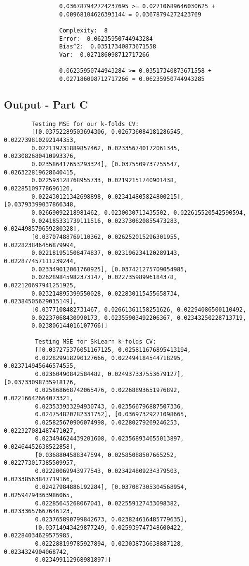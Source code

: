 \begin{verbatim}
                0.036787942724237695 >= 0.02710689646030625 + 
                0.00968104626393144 = 0.03678794272423769
                
                Complexity:  8
                Error:  0.06235950744943284
                Bias^2:  0.03517340873671558
                Var:  0.027186098712717266
                
                0.06235950744943284 >= 0.03517340873671558 + 
                0.027186098712717266 = 0.06235950744943285
\end{verbatim}

\subsection{Output - Part C}
\label{chap:Output - Part C}
\begin{verbatim}
        Testing MSE for our k-folds CV:  
        [[0.03752289503694306, 0.026736084181286545, 0.022739810292144353,
        0.022119731889857462, 0.023356740172061345, 0.023082680410993376,
        0.023586417653293324], [0.0375509737755547, 0.026322819628640415,
        0.022593128768955733, 0.02192151740901438, 0.02285109778696126,
        0.022430121342698898, 0.023414805824800215], [0.03793399037866348,
        0.02669092218981462, 0.0230030713435502, 0.022615520542590594,
        0.024185331739111516, 0.023730620855473283, 0.024498579659280328],
        [0.03707488769110362, 0.026252015296301955, 0.022823846456879994,
        0.022181951508474837, 0.023196234120289143, 0.022877457111239244,
        0.023349012061760925], [0.037421275709054985,
        0.026289845982373147, 0.02273598996184378, 0.022120697941251925,
        0.023214895399550028, 0.022830115455658734, 0.02384505629015149],
        [0.0377108482731467, 0.02661361158251626, 0.02294086500110492,
        0.02237068430990173, 0.02355903492206367, 0.02343250228713719,
        0.023806144016107766]]
        
         Testing MSE for SkLearn k-folds CV:  
         [[0.037275376051167125, 0.025811676895413194,
         0.022829918290127666, 0.022494184544718295, 0.023714945646574555,
         0.02360490842584482, 0.024937337553679127], [0.03733098735918176,
         0.025868668742065476, 0.02268893651976892, 0.02216642664073321,
         0.023533933294930743, 0.023566796887507336,
         0.024754820782331752], [0.03697329271098665,
         0.025825670906074998, 0.02280279269246253, 0.022327081487471027, 
         0.023494624439201608, 0.023568934655013897, 0.02464452638522858],
         [0.0368804588347594, 0.02585088507665252, 0.022773017385509957,
         0.02220069943977543, 0.023424809234379503, 0.02338563847719166,
         0.02427984886192284], [0.037087305304568954, 0.02594794363986065,
         0.02285645268067041, 0.022559127433098382, 0.02333657667646123,
         0.023765890799842673, 0.023824616485779635],
         [0.03714943429877249, 0.025939747348600422, 0.02284034629575985,
         0.022288199785927894, 0.023038736638887128, 0.0234324904068742,
         0.023499112968981897]]

\end{verbatim}

